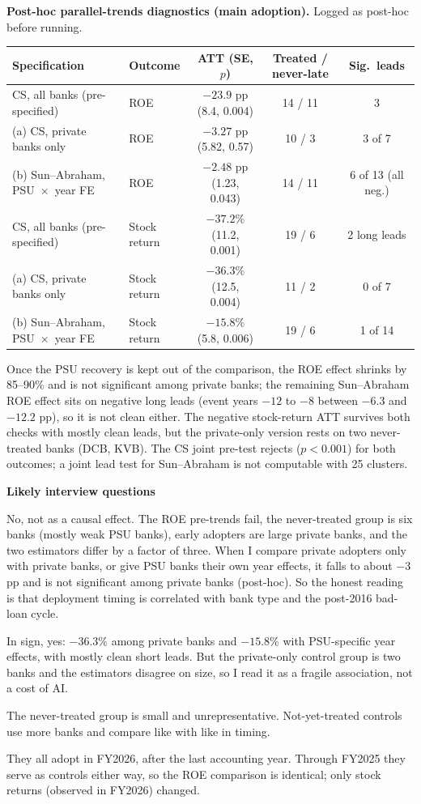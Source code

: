 \documentclass[10.5pt,a4paper]{article}
\newenvironment{qa}{\par\noindent\textcolor{qcol}{\textbf{Likely interview questions}}\begin{description}[font=\normalfont\itshape,leftmargin=0pt,style=nextline]}{\end{description}}
\newcommand{\q}[2]{\item[``#1'']#2}
\begin{document}
\textbf{Post-hoc parallel-trends diagnostics (main adoption).} Logged as post-hoc before running.
\begin{center}\footnotesize\setlength{\tabcolsep}{4pt}
\begin{tabular}{llccc}
\toprule
Specification & Outcome & ATT (SE, $p$) & Treated / never-late & Sig.\ leads\\
\midrule
CS, all banks (pre-specified) & ROE & $-23.9$ pp (8.4, 0.004) & 14 / 11 & 3\\
(a) CS, private banks only & ROE & $-3.27$ pp (5.82, 0.57) & 10 / 3 & 3 of 7\\
(b) Sun--Abraham, PSU~$\times$~year FE & ROE & $-2.48$ pp (1.23, 0.043) & 14 / 11 & 6 of 13 (all neg.)\\
\midrule
CS, all banks (pre-specified) & Stock return & $-37.2\%$ (11.2, 0.001) & 19 / 6 & 2 long leads\\
(a) CS, private banks only & Stock return & $-36.3\%$ (12.5, 0.004) & 11 / 2 & 0 of 7\\
(b) Sun--Abraham, PSU~$\times$~year FE & Stock return & $-15.8\%$ (5.8, 0.006) & 19 / 6 & 1 of 14\\
\bottomrule
\end{tabular}
\end{center}
Once the PSU recovery is kept out of the comparison, the ROE effect shrinks by 85--90\% and is not significant among
private banks; the remaining Sun--Abraham ROE effect sits on negative long leads (event years $-12$ to $-8$ between
$-6.3$ and $-12.2$ pp), so it is not clean either. The negative stock-return ATT survives both checks with mostly clean
leads, but the private-only version rests on two never-treated banks (DCB, KVB). The CS joint pre-test rejects
($p<0.001$) for both outcomes; a joint lead test for Sun--Abraham is not computable with 25 clusters.
\begin{qa}
\q{A $-24$ pp effect on ROE is huge. Do you believe it?}{No, not as a causal effect. The ROE pre-trends fail, the
never-treated group is six banks (mostly weak PSU banks), early adopters are large private banks, and the two
estimators differ by a factor of three. When I compare private adopters only with private banks, or give PSU banks
their own year effects, it falls to about $-3$ pp and is not significant among private banks (post-hoc). So the honest
reading is that deployment timing is correlated with bank type and the post-2016 bad-loan cycle.}
\q{Does the negative stock-return effect survive?}{In sign, yes: $-36.3\%$ among private banks and $-15.8\%$ with
PSU-specific year effects, with mostly clean short leads. But the private-only control group is two banks and the
estimators disagree on size, so I read it as a fragile association, not a cost of AI.}
\q{Why not-yet-treated rather than never-treated controls?}{The never-treated group is small and unrepresentative.
Not-yet-treated controls use more banks and compare like with like in timing.}
\q{Why did adding four new adopters not change the ROE estimate at all?}{They all adopt in FY2026, after the last
accounting year. Through FY2025 they serve as controls either way, so the ROE comparison is identical; only stock
returns (observed in FY2026) changed.}
\end{qa}
\end{document}
